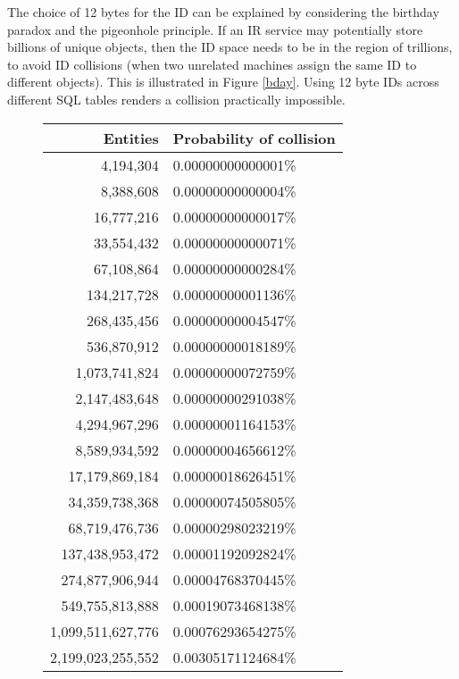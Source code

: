 The choice of 12 bytes for the ID can be explained by
considering the birthday paradox and the pigeonhole principle.
If an IR service may potentially store billions of unique objects,
then the ID space needs to be in the region of trillions, to avoid
ID collisions (when two unrelated machines assign the same ID to
different objects).  This is illustrated in Figure \ref{bday}.  Using
12 byte IDs across different SQL tables renders a collision
practically impossible.

\begin{figure}
    \centering
    \singlespacing
    \begin{tabular}{r|l}
    Entities & Probability of collision\\
    \hline
    4,194,304               &   0.00000000000001\%\\
    8,388,608               &   0.00000000000004\%\\
    16,777,216              &   0.00000000000017\%\\
    33,554,432              &   0.00000000000071\%\\
    67,108,864              &   0.00000000000284\%\\
    134,217,728             &   0.00000000001136\%\\
    268,435,456             &   0.00000000004547\%\\
    536,870,912             &   0.00000000018189\%\\
    1,073,741,824           &   0.00000000072759\%\\
    2,147,483,648           &   0.00000000291038\%\\
    4,294,967,296           &   0.00000001164153\%\\
    8,589,934,592           &   0.00000004656612\%\\
    17,179,869,184          &   0.00000018626451\%\\
    34,359,738,368          &   0.00000074505805\%\\
    68,719,476,736          &   0.00000298023219\%\\
    137,438,953,472         &   0.00001192092824\%\\
    274,877,906,944         &   0.00004768370445\%\\
    549,755,813,888         &   0.00019073468138\%\\
    1,099,511,627,776       &   0.00076293654275\%\\
    2,199,023,255,552       &   0.00305171124684\%\\

\end{tabular}
\end{figure}
